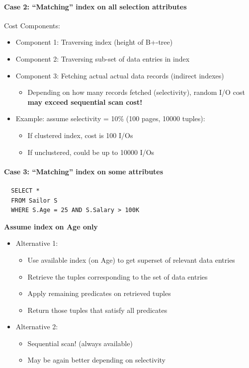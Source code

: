 \paragraph{Case 2: ``Matching'' index on all selection attributes}
Cost Components:
\begin{itemize}
\item Component 1: Traversing index (height of B+-tree)
\item Component 2: Traversing sub-set of data entries in index
\item Component 3: Fetching actual actual data records (indirect indexes)
  \begin{itemize}
  \item Depending on how many records fetched (selectivity),
    random I/O cost \textbf{may exceed sequential scan cost!}
  \end{itemize}
\item Example: assume selectivity = 10\%
  (100 pages, 10000 tuples):
  \begin{itemize}
  \item If clustered index, cost is 100 I/Os
  \item If unclustered, could be up to 10000 I/Os
  \end{itemize}
\end{itemize}



\paragraph{Case 3: ``Matching'' index on some attributes}
\begin{lstlisting}
  SELECT *
  FROM Sailor S
  WHERE S.Age = 25 AND S.Salary > 100K
\end{lstlisting}

\textbf{Assume index on Age only}
\begin{itemize}
\item Alternative 1:
  \begin{itemize}
  \item Use available index (on Age) to get superset of relevant data
    entries
  \item Retrieve the tuples corresponding to the set of data
    entries
  \item Apply remaining predicates on retrieved tuples
  \item Return those tuples that satisfy all predicates
  \end{itemize}

\item Alternative 2:
  \begin{itemize}
  \item Sequential scan! (always available)
  \item May be again better depending on selectivity
  \end{itemize}
\end{itemize}

